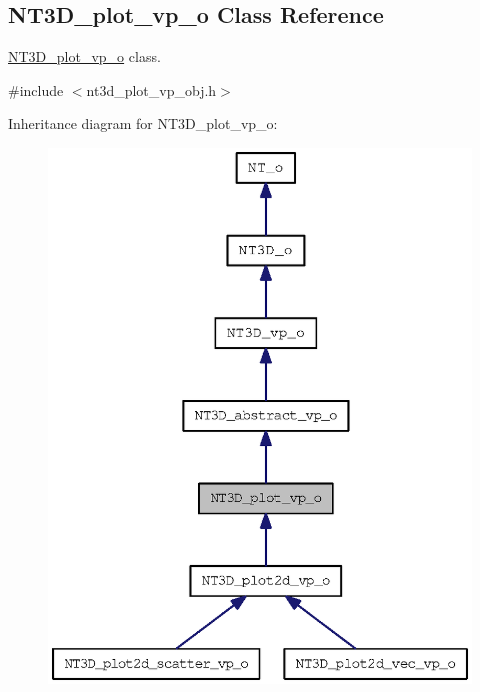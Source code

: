 \subsection{NT3D\_\-plot\_\-vp\_\-o Class Reference}
\label{class_n_t3_d__plot__vp__o}


\hyperlink{class_n_t3_d__plot__vp__o}{NT3D\_\-plot\_\-vp\_\-o} class.  




{\ttfamily \#include $<$nt3d\_\-plot\_\-vp\_\-obj.h$>$}



Inheritance diagram for NT3D\_\-plot\_\-vp\_\-o:
\nopagebreak
\begin{figure}[H]
\begin{center}
\leavevmode
\includegraphics[width=334pt]{class_n_t3_d__plot__vp__o__inherit__graph}
\end{center}
\end{figure}


